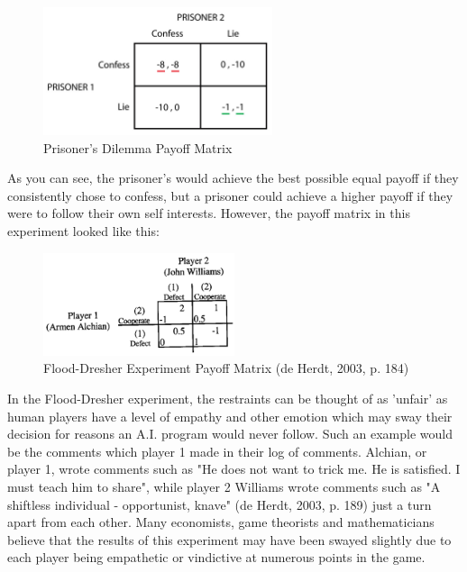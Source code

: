 \documentclass[12pt,a4paper]{article}
\begin{document}
\begin{figure}[h]
	\centering
		\includegraphics[width=0.6\textwidth]{DilemmaPayoffMatrix}
		\caption{Prisoner's Dilemma Payoff Matrix}
\end{figure}

\noindent
As you can see, the prisoner's would achieve the best possible equal payoff if they consistently chose to confess, but a prisoner could achieve a higher payoff if they were to follow their own self interests. However, the payoff matrix in this experiment looked like this:

\begin{figure}[H]
	\centering
		\includegraphics[width=0.5\textwidth]{FloodDresherPayoff}
		\caption{Flood-Dresher Experiment Payoff Matrix (de Herdt, 2003, p. 184)}
\end{figure}

\noindent
In the Flood-Dresher experiment, the restraints can be thought of as 'unfair' as human players have a level of empathy and other emotion which may sway their decision for reasons an A.I. program would never follow. Such an example would be the comments which player 1 made in their log of comments. Alchian, or player 1, wrote comments such as "He does not want to trick me. He is satisfied. I must teach him to share", while player 2 Williams wrote comments such as "A shiftless individual - opportunist, knave" (de Herdt, 2003, p. 189) just a turn apart from each other. Many economists, game theorists and mathematicians believe that the results of this experiment may have been swayed slightly due to each player being empathetic or vindictive at numerous points in the game. \\
\end{document}
